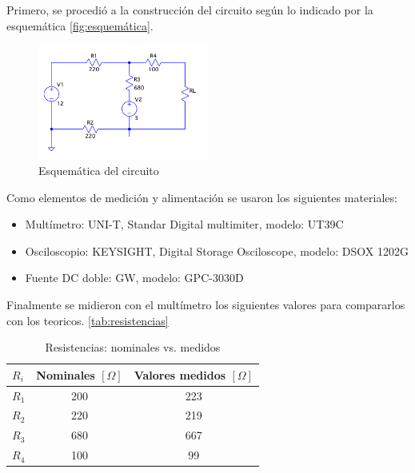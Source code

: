 \documentclass{article}
\begin{document}
        
        Primero, se procedió a la construcción del circuito según lo indicado por la esquemática \autoref{fig:esquemática}.\par %

\begin{figure}[!h]
  \centering
  \includegraphics[width=0.5\textwidth]{circuitoLTSpice.png}
  \caption{Esquemática del circuito}
  \label{fig:esquemática}
\end{figure}
        
       Como elementos de medición y alimentación se usaron los siguientes materiales:\par
       
                   \begin{itemize}
                \item Multímetro: UNI-T,  Standar Digital multimiter, modelo: UT39C
                \item Osciloscopio: KEYSIGHT, Digital Storage Osciloscope, modelo: DSOX 1202G 
                \item Fuente DC doble: GW, modelo: GPC-3030D
                \end{itemize}

        Finalmente se midieron con el multímetro los siguientes valores para compararlos con los teoricos. \autoref{tab:resistencias}\par
        
        \begin{table}[H]
            \centering
            \begin{tabular}{|l|c|c|}
            \hline
            $R_i$ & \multicolumn{1}{l|}{Nominales $ [\Omega] $} & \multicolumn{1}{l|}{Valores medidos $ [\Omega] $}\\ \hline
            $R_1$ & 200         & 223         \\ \hline
            $R_2$ & 220         & 219         \\ \hline
            $R_3$ & 680         & 667         \\ \hline
            $R_4$ & 100         & 99          \\ \hline
            \end{tabular}
            \caption{Resistencias: nominales vs. medidos}
            \label{tab:resistencias}
        \end{table}
\end{document}
